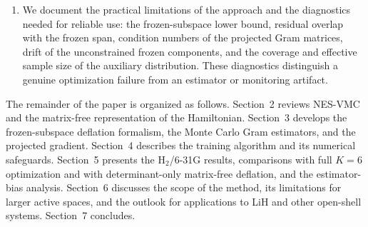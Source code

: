 \documentclass[11pt,a4paper]{article}
\begin{document}
\begin{enumerate}
\item We document the practical limitations of the approach and the diagnostics needed for reliable use: the frozen-subspace lower bound, residual overlap with the frozen span, condition numbers of the projected Gram matrices, drift of the unconstrained frozen components, and the coverage and effective sample size of the auxiliary distribution. These diagnostics distinguish a genuine optimization failure from an estimator or monitoring artifact.
\end{enumerate}

The remainder of the paper is organized as follows. Section~2 reviews NES-VMC and the matrix-free representation of the Hamiltonian. Section~3 develops the frozen-subspace deflation formalism, the Monte Carlo Gram estimators, and the projected gradient. Section~4 describes the training algorithm and its numerical safeguards. Section~5 presents the H$_2$/6-31G results, comparisons with full $K=6$ optimization and with determinant-only matrix-free deflation, and the estimator-bias analysis. Section~6 discusses the scope of the method, its limitations for larger active spaces, and the outlook for applications to LiH and other open-shell systems. Section~7 concludes.



\end{document}
